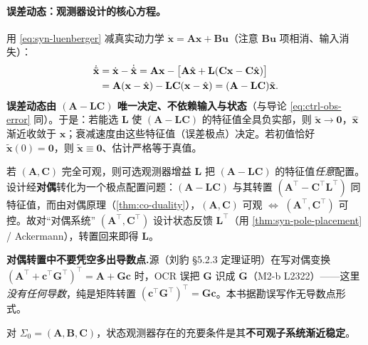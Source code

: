 \paragraph{误差动态：观测器设计的核心方程。}
用 \cref{eq:syn-luenberger} 减真实动力学 $\dot{\mathbf x}=\mathbf A\mathbf x+\mathbf B\mathbf u$（注意 $\mathbf B\mathbf u$ 项相消、输入消失）：
\begin{align}
  \dot{\tilde{\mathbf x}}&=\dot{\mathbf x}-\dot{\hat{\mathbf x}}=\mathbf A\mathbf x-\big[\mathbf A\hat{\mathbf x}+\mathbf L(\mathbf C\mathbf x-\mathbf C\hat{\mathbf x})\big]\notag\\
  &=\mathbf A(\mathbf x-\hat{\mathbf x})-\mathbf L\mathbf C(\mathbf x-\hat{\mathbf x})=(\mathbf A-\mathbf L\mathbf C)\tilde{\mathbf x}.
  \label{eq:syn-obs-error}
\end{align}
\textbf{误差动态由 $(\mathbf A-\mathbf L\mathbf C)$ 唯一决定、不依赖输入与状态}（与导论 \cref{eq:ctrl-obs-error} 同）。于是：若能选 $\mathbf L$ 使 $(\mathbf A-\mathbf L\mathbf C)$ 的特征值全具负实部，则 $\tilde{\mathbf x}\to\mathbf 0$，$\hat{\mathbf x}$ 渐近收敛于 $\mathbf x$；衰减速度由这些特征值（误差极点）决定。若初值恰好 $\tilde{\mathbf x}(0)=\mathbf 0$，则 $\tilde{\mathbf x}\equiv\mathbf 0$、估计严格等于真值。

\begin{theorem}[观测器增益设计 = 对偶极点配置]
\label{thm:syn-obs-design}
若 $(\mathbf A,\mathbf C)$ 完全可观，则可选观测器增益 $\mathbf L$ 把 $(\mathbf A-\mathbf L\mathbf C)$ 的特征值\emph{任意}配置。设计经\textbf{对偶}转化为一个极点配置问题：$(\mathbf A-\mathbf L\mathbf C)$ 与其转置 $(\mathbf A^\top-\mathbf C^\top\mathbf L^\top)$ 同特征值，而由对偶原理（\cref{thm:co-duality}），$(\mathbf A,\mathbf C)$ 可观 $\iff$ $(\mathbf A^\top,\mathbf C^\top)$ 可控\cite{liubao2006modern}。故对“对偶系统” $(\mathbf A^\top,\mathbf C^\top)$ 设计状态反馈 $\mathbf L^\top$（用 \cref{thm:syn-pole-placement} / Ackermann），转置回来即得 $\mathbf L$。
\end{theorem}

\begin{note}
\textbf{对偶转置中不要凭空多出导数点.}\;源（刘豹 §5.2.3 定理证明）在写对偶变换 $(\mathbf A^\top+\mathbf c^\top\mathbf G^\top)^\top=\mathbf A+\mathbf G\mathbf c$ 时，OCR 误把 $\mathbf G$ 识成 $\dot{\mathbf G}$（M2-b L2322）——这里\emph{没有任何导数}，纯是矩阵转置 $(\mathbf c^\top\mathbf G^\top)^\top=\mathbf G\mathbf c$。本书据勘误写作无导数点形式。
\end{note}

\begin{theorem}[观测器存在的充要条件]
\label{thm:syn-obs-exist}
对 $\Sigma_0=(\mathbf A,\mathbf B,\mathbf C)$，状态观测器存在的充要条件是其\textbf{不可观子系统渐近稳定}\cite{liubao2006modern,zhang2017modern}。
\end{theorem}

